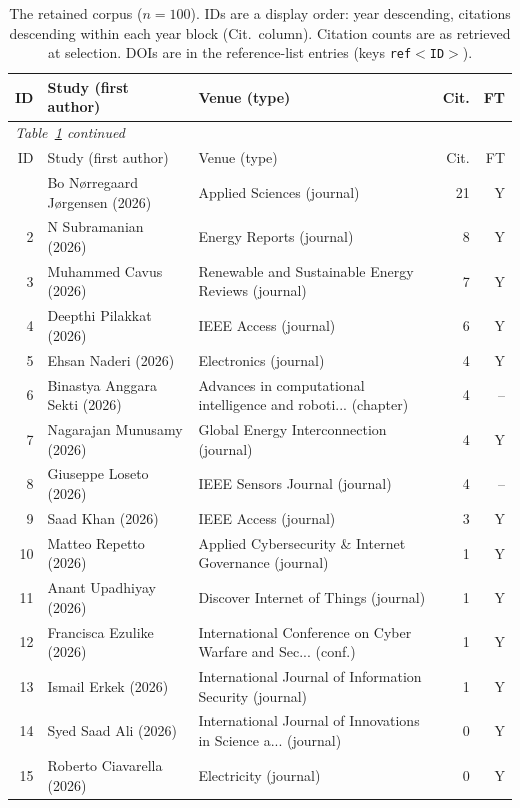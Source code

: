 \setlength{\tabcolsep}{4pt}
\begin{longtable}{@{}r p{5.9cm} p{4.4cm} r r@{}}
\caption{The retained corpus ($n=100$). IDs are a display order: year
descending, citations descending within each year block (Cit.\ column).
Citation counts are as retrieved at selection. DOIs are in the reference-list
entries (keys \texttt{ref$<$ID$>$}).}\label{tab:corpus}\\
\toprule
ID & Study (first author) & Venue (type) & Cit. & FT \\
\midrule
\endfirsthead
\multicolumn{5}{l}{\emph{Table~\ref{tab:corpus} continued}}\\
\toprule
ID & Study (first author) & Venue (type) & Cit. & FT \\
\midrule
\endhead
\bottomrule
\endfoot
\endlastfoot
1 & Bo Nørregaard Jørgensen (2026) & Applied Sciences (journal) & 21 & Y \\
2 & N Subramanian (2026) & Energy Reports (journal) & 8 & Y \\
3 & Muhammed Cavus (2026) & Renewable and Sustainable Energy Reviews (journal) & 7 & Y \\
4 & Deepthi Pilakkat (2026) & IEEE Access (journal) & 6 & Y \\
5 & Ehsan Naderi (2026) & Electronics (journal) & 4 & Y \\
6 & Binastya Anggara Sekti (2026) & Advances in computational intelligence and roboti... (chapter) & 4 & -- \\
7 & Nagarajan Munusamy (2026) & Global Energy Interconnection (journal) & 4 & Y \\
8 & Giuseppe Loseto (2026) & IEEE Sensors Journal (journal) & 4 & -- \\
9 & Saad Khan (2026) & IEEE Access (journal) & 3 & Y \\
10 & Matteo Repetto (2026) & Applied Cybersecurity \& Internet Governance (journal) & 1 & Y \\
11 & Anant Upadhiyay (2026) & Discover Internet of Things (journal) & 1 & Y \\
12 & Francisca Ezulike (2026) & International Conference on Cyber Warfare and Sec... (conf.) & 1 & Y \\
13 & Ismail Erkek (2026) & International Journal of Information Security (journal) & 1 & Y \\
14 & Syed Saad Ali (2026) & International Journal of Innovations in Science a... (journal) & 0 & Y \\
15 & Roberto Ciavarella (2026) & Electricity (journal) & 0 & Y \\

\end{longtable}
